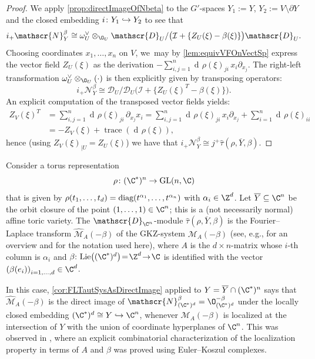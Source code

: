 \documentclass[JEP,XML,SOM,Unicode,published]{cedram}
\newcommand\hto{\mathrel{\lhook\joinrel\to}}
\newcommand{\cI}{\mathcal{I}}
\DeclareMathOperator{\differential}{d\!}
\DeclareMathOperator{\diag}{\textup{diag}}
\DeclareMathOperator{\GL}{\textup{GL}}
\DeclareMathOperator{\Lie}{\textup{Lie}}
\DeclareMathOperator{\trace}{trace}
\let\originalleft\left
\let\originalright\right
\renewcommand{\left}{\mathopen{}\mathclose\bgroup\originalleft}
\renewcommand{\right}{\aftergroup\egroup\originalright}
\begin{document}
\begin{proof}
We apply \cref{prop:directImageOfNbeta} to the $G'$-spaces $Y_1 := Y$, $Y_2 := V \setminus \partial Y$ and the closed embedding $i \colon Y_1 \hto Y_2$ to see that
\[
i_+ \mathscr{N}_{Y}^{\beta} \cong \omega_{U}^\vee \otimes_{\O_U} \mathscr{D}_U/\big(\cI + \{Z_U(\xi)-\beta(\xi)\}\big)\mathscr{D}_U.
\]
Choosing coordinates $x_1,\dots,x_n$ on $V$, we~may by \cref{lem:equivVFOnVectSp} express the vector field $Z_U(\xi)$ as the derivation $-\sum_{i,j=1}^n \differential\rho(\xi)_{ji} \, x_i \partial_{x_j}$. The right-left transformation $\omega_U^\vee \otimes_{\O_U} (\cdot)$ is then explicitly given by transposing operators:
\[
i_+ \mathscr{N}_{Y}^\beta \cong \mathscr{D}_U/\mathscr{D}_U \big(\cI + \{Z_U(\xi)^T-\beta(\xi)\}\big).
\]
An explicit computation of the transposed vector fields yields:
\begin{align*}
Z_V(\xi)^T & = \sum_{i,j=1}^n \differential\rho(\xi)_{ji} \, \partial_{x_j} x_i
= \sum_{i,j=1}^n \differential \rho(\xi)_{ji} \, x_i \partial_{x_j} + \sum_{i=1}^n \differential\rho(\xi)_{ii} \\
&= -Z_V(\xi)+\trace(\differential \rho(\xi)),
\end{align*}
hence (using $Z_V(\xi)_{|U}=Z_U(\xi)$) we have that $i_+ \mathscr{N}_{Y}^\beta \cong j^+ \hat{\tau}(\rho, \overline{Y}, \beta)$.
\end{proof}

\begin{exa}

Consider a torus representation\enlargethispage{-2\baselineskip}
\[
\rho \colon (\C^*)^n \to \GL(n,\C)
\]
that is given by $\rho(t_1,\dots,t_d) = \diag(t^{\alpha_1}, \dots, t^{\alpha_n})$ with $\alpha_i \in \Z^d$. Let $\overline{Y} \subseteq \C^n$ be the orbit closure of the point $(1,\dots,1) \in \C^n$; this is a (not necessarily normal) affine toric variety. The $\mathscr{D}_{\C^n}$\nobreakdash-mod\-ule $\hat{\tau}(\rho, \overline{Y}, \beta)$ is the Fourier--Laplace transform $\widehat{\mathscr{M}}_{A}(-\beta)$ of the GKZ-system $\mathscr{M}_{A}(-\beta)$ (see, e.g., \cite{GKZReview} for an overview and for the notation used here), where $A$ is the $d \times n$-matrix whose $i$-th column is $\alpha_i$ and \hbox{$\beta{:}\, \Lie\bigl((\C^*)^d\bigr) \!=\! \Z^d \!\to\! \C$} is identified with the vector $\left(\beta(e_i)\right)_{i=1,\dots,d} \in \C^d$.

In this case, \cref{cor:FLTautSysAsDirectImage} applied to $Y = \overline{Y} \cap (\C^*)^n$ says that $\widehat{\mathscr{M}}_{A}(-\beta)$ is the direct image of $\mathscr{N}_{(\C^*)^d}^\beta = \O_{(\C^*)^d}^{-\beta}$ under the locally closed embedding $(\C^*)^d \cong Y \hto \C^n$, whenever $\mathscr{M}_{A}(-\beta)$ is localized at the intersection of $Y$ with the union of coordinate hyperplanes of $\C^n$. This was observed in \cite{SW09}, where an explicit combinatorial characterization of the localization property in terms of $A$ and $\beta$ was proved using Euler--Koszul complexes.
\end{exa}
\end{document}
